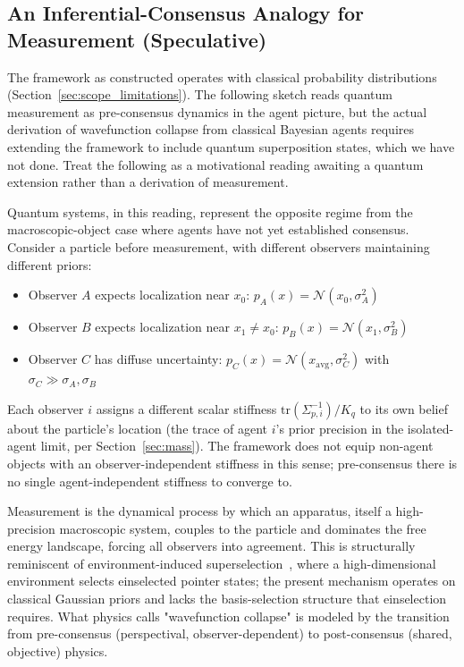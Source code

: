 \documentclass[11pt]{article}
\begin{document}
\subsection{An Inferential-Consensus Analogy for Measurement (Speculative)}
\label{sec:measurement_analogy}

The framework as constructed operates with classical probability distributions (Section~\ref{sec:scope_limitations}). The following sketch reads quantum measurement as pre-consensus dynamics in the agent picture, but the actual derivation of wavefunction collapse from classical Bayesian agents requires extending the framework to include quantum superposition states, which we have not done. Treat the following as a motivational reading awaiting a quantum extension rather than a derivation of measurement.

Quantum systems, in this reading, represent the opposite regime from the macroscopic-object case where agents have not yet established consensus. Consider a particle before measurement, with different observers maintaining different priors:

\begin{itemize}
\item Observer $A$ expects localization near $x_0$:
      $p_A(x) = \mathcal{N}(x_0, \sigma_A^2)$
\item Observer $B$ expects localization near $x_1 \neq x_0$:
      $p_B(x) = \mathcal{N}(x_1, \sigma_B^2)$
\item Observer $C$ has diffuse uncertainty:
      $p_C(x) = \mathcal{N}(x_{\text{avg}}, \sigma_C^2)$ with $\sigma_C \gg \sigma_A, \sigma_B$
\end{itemize}

Each observer $i$ assigns a different scalar stiffness $\mathrm{tr}(\Sigma_{p,i}^{-1})/K_q$ to its own belief about the particle's location (the trace of agent $i$'s prior precision in the isolated-agent limit, per Section~\ref{sec:mass}). The framework does not equip non-agent objects with an observer-independent stiffness in this sense; pre-consensus there is no single agent-independent stiffness to converge to.

Measurement is the dynamical process by which an apparatus, itself a high-precision macroscopic system, couples to the particle and dominates the free energy landscape, forcing all observers into agreement. This is structurally reminiscent of environment-induced superselection~\cite{Zurek2003}, where a high-dimensional environment selects einselected pointer states; the present mechanism operates on classical Gaussian priors and lacks the basis-selection structure that einselection requires. What physics calls "wavefunction collapse" is modeled by the transition from pre-consensus (perspectival, observer-dependent) to post-consensus (shared, objective) physics.
\end{document}
